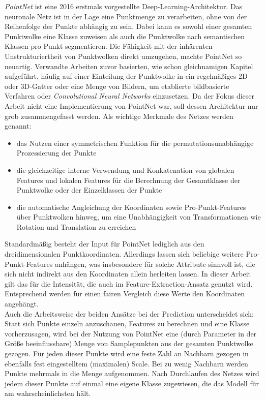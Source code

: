 \textit{PointNet} \citep{Charles.etal-2017} ist eine 2016 erstmals vorgestellte Deep-Learning-Architektur. Das neuronale Netz ist in der Lage eine Punktmenge zu verarbeiten, ohne von der Reihenfolge der Punkte abhängig zu sein. Dabei kann es sowohl einer gesamten Punktwolke eine Klasse zuweisen als auch die Punktwolke nach semantischen Klassen pro Punkt segmentieren. Die Fähigkeit mit der inhärenten Unstrukturiertheit von Punktwolken direkt umzugehen, machte PointNet so neuartig. Verwandte Arbeiten zuvor basierten, wie schon gleichnamigen Kapitel aufgeführt, häufig auf einer Einteilung der Punktwolke in ein regelmäßiges 2D- oder 3D-Gatter oder eine Menge von Bildern, um etablierte bildbasierte Verfahren oder \textit{Convolutional Neural Networks} einzusetzen.
Da der Fokus dieser Arbeit nicht eine Implementierung von PointNet war, soll dessen Architektur nur grob zusammengefasst werden. Als wichtige Merkmale des Netzes werden genannt: 
\begin{itemize}
    \item das Nutzen einer symmetrischen Funktion für die permutationsunabhängige Prozessierung der Punkte
    \item die gleichzeitige interne Verwendung und Konkatenation von globalen Features und lokalen Features für die Berechnung der Gesamtklasse der Punktwolke oder der Einzelklassen der Punkte
    \item die automatische Angleichung der Koordinaten sowie Pro-Punkt-Features über Punktwolken hinweg, um eine Unabhängigkeit von Transformationen wie Rotation und Translation zu erreichen
\end{itemize}
Standardmäßig besteht der Input für PointNet lediglich aus den dreidimensionalen Punktkoordinaten. Allerdings lassen sich beliebige weitere Pro-Punkt-Features anhängen, was insbesondere für solche Attribute sinnvoll ist, die sich nicht indirekt aus den Koordinaten allein herleiten lassen. In dieser Arbeit gilt das für die Intensität, die auch im Feature-Extraction-Ansatz genutzt wird. Entsprechend werden für einen fairen Vergleich diese Werte den Koordinaten angehängt. \\
Auch die Arbeitsweise der beiden Ansätze bei der Prediction unterscheidet sich: Statt sich Punkte einzeln anzuschauen, Features zu berechnen und eine Klasse vorherzusagen, wird bei der Nutzung von PointNet eine (durch Parameter in der Größe beeinflussbare) Menge von Samplepunkten aus der gesamten Punktwolke gezogen. Für jeden dieser Punkte wird eine feste Zahl an Nachbarn gezogen in ebenfalls fest eingestelltem (maximalen) Scale. Bei zu wenig Nachbarn werden Punkte mehrmals in die Menge aufgenommen. Nach Durchlaufen des Netzes wird jedem dieser Punkte auf einmal eine eigene Klasse zugewiesen, die das Modell für am wahrscheinlichsten hält. \\
